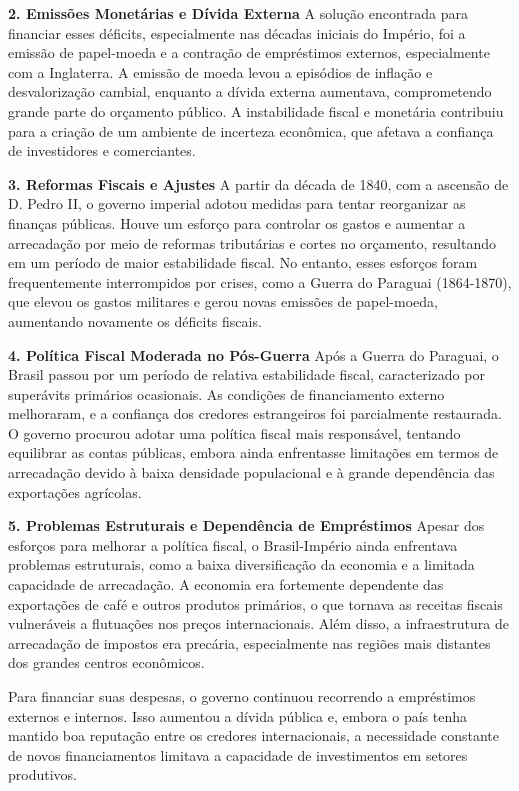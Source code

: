 \documentclass[a4paper,12pt]{article}[abntex2]
\begin{document}
\textbf{2. Emissões Monetárias e Dívida Externa}
A solução encontrada para financiar esses déficits, especialmente nas décadas iniciais do Império, foi a emissão de papel-moeda e a contração de empréstimos externos, especialmente com a Inglaterra. A emissão de moeda levou a episódios de inflação e desvalorização cambial, enquanto a dívida externa aumentava, comprometendo grande parte do orçamento público. A instabilidade fiscal e monetária contribuiu para a criação de um ambiente de incerteza econômica, que afetava a confiança de investidores e comerciantes.

\textbf{3. Reformas Fiscais e Ajustes}
A partir da década de 1840, com a ascensão de D. Pedro II, o governo imperial adotou medidas para tentar reorganizar as finanças públicas. Houve um esforço para controlar os gastos e aumentar a arrecadação por meio de reformas tributárias e cortes no orçamento, resultando em um período de maior estabilidade fiscal. No entanto, esses esforços foram frequentemente interrompidos por crises, como a Guerra do Paraguai (1864-1870), que elevou os gastos militares e gerou novas emissões de papel-moeda, aumentando novamente os déficits fiscais.

\textbf{4. Política Fiscal Moderada no Pós-Guerra}
Após a Guerra do Paraguai, o Brasil passou por um período de relativa estabilidade fiscal, caracterizado por superávits primários ocasionais. As condições de financiamento externo melhoraram, e a confiança dos credores estrangeiros foi parcialmente restaurada. O governo procurou adotar uma política fiscal mais responsável, tentando equilibrar as contas públicas, embora ainda enfrentasse limitações em termos de arrecadação devido à baixa densidade populacional e à grande dependência das exportações agrícolas.

\textbf{5. Problemas Estruturais e Dependência de Empréstimos}
Apesar dos esforços para melhorar a política fiscal, o Brasil-Império ainda enfrentava problemas estruturais, como a baixa diversificação da economia e a limitada capacidade de arrecadação. A economia era fortemente dependente das exportações de café e outros produtos primários, o que tornava as receitas fiscais vulneráveis a flutuações nos preços internacionais. Além disso, a infraestrutura de arrecadação de impostos era precária, especialmente nas regiões mais distantes dos grandes centros econômicos.

Para financiar suas despesas, o governo continuou recorrendo a empréstimos externos e internos. Isso aumentou a dívida pública e, embora o país tenha mantido boa reputação entre os credores internacionais, a necessidade constante de novos financiamentos limitava a capacidade de investimentos em setores produtivos.
\end{document}
